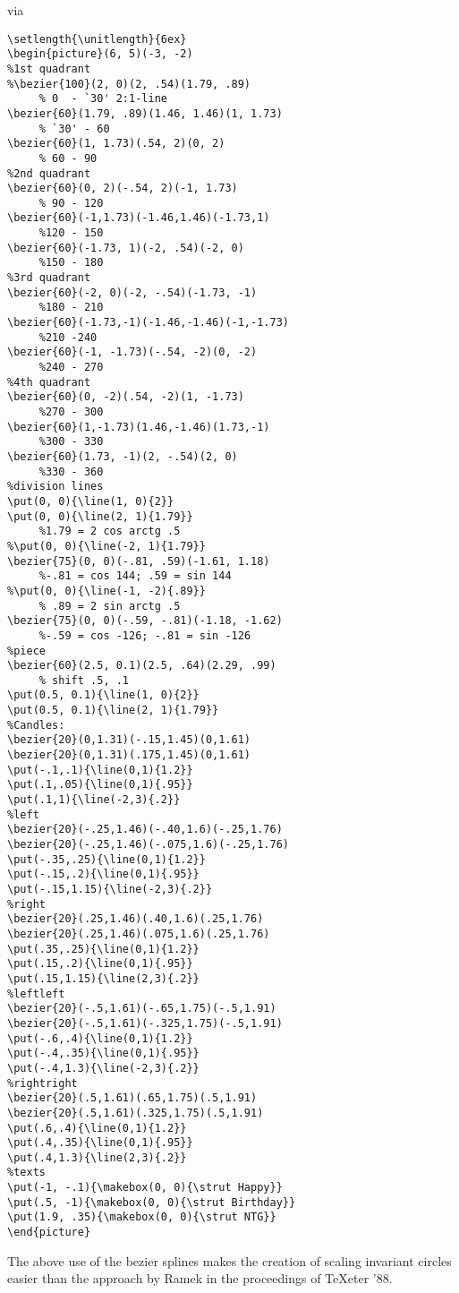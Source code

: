 \begin{itemize}
\par\noindent via
\begingroup\small
\begin{verbatim}
\setlength{\unitlength}{6ex}
\begin{picture}(6, 5)(-3, -2)
%1st quadrant
%\bezier{100}(2, 0)(2, .54)(1.79, .89)
     % 0  - `30' 2:1-line
\bezier{60}(1.79, .89)(1.46, 1.46)(1, 1.73)
     % `30' - 60
\bezier{60}(1, 1.73)(.54, 2)(0, 2)
     % 60 - 90
%2nd quadrant
\bezier{60}(0, 2)(-.54, 2)(-1, 1.73)
     % 90 - 120
\bezier{60}(-1,1.73)(-1.46,1.46)(-1.73,1)
     %120 - 150
\bezier{60}(-1.73, 1)(-2, .54)(-2, 0)
     %150 - 180
%3rd quadrant
\bezier{60}(-2, 0)(-2, -.54)(-1.73, -1)
     %180 - 210
\bezier{60}(-1.73,-1)(-1.46,-1.46)(-1,-1.73)
     %210 -240
\bezier{60}(-1, -1.73)(-.54, -2)(0, -2)
     %240 - 270
%4th quadrant
\bezier{60}(0, -2)(.54, -2)(1, -1.73)
     %270 - 300
\bezier{60}(1,-1.73)(1.46,-1.46)(1.73,-1)
     %300 - 330
\bezier{60}(1.73, -1)(2, -.54)(2, 0)
     %330 - 360
%division lines
\put(0, 0){\line(1, 0){2}}
\put(0, 0){\line(2, 1){1.79}}
     %1.79 = 2 cos arctg .5
%\put(0, 0){\line(-2, 1){1.79}}
\bezier{75}(0, 0)(-.81, .59)(-1.61, 1.18)
     %-.81 = cos 144; .59 = sin 144
%\put(0, 0){\line(-1, -2){.89}}
     % .89 = 2 sin arctg .5
\bezier{75}(0, 0)(-.59, -.81)(-1.18, -1.62)
     %-.59 = cos -126; -.81 = sin -126
%piece
\bezier{60}(2.5, 0.1)(2.5, .64)(2.29, .99)
     % shift .5, .1
\put(0.5, 0.1){\line(1, 0){2}}
\put(0.5, 0.1){\line(2, 1){1.79}}
%Candles:
\bezier{20}(0,1.31)(-.15,1.45)(0,1.61)
\bezier{20}(0,1.31)(.175,1.45)(0,1.61)
\put(-.1,.1){\line(0,1){1.2}}
\put(.1,.05){\line(0,1){.95}}
\put(.1,1){\line(-2,3){.2}}
%left
\bezier{20}(-.25,1.46)(-.40,1.6)(-.25,1.76)
\bezier{20}(-.25,1.46)(-.075,1.6)(-.25,1.76)
\put(-.35,.25){\line(0,1){1.2}}
\put(-.15,.2){\line(0,1){.95}}
\put(-.15,1.15){\line(-2,3){.2}}
%right
\bezier{20}(.25,1.46)(.40,1.6)(.25,1.76)
\bezier{20}(.25,1.46)(.075,1.6)(.25,1.76)
\put(.35,.25){\line(0,1){1.2}}
\put(.15,.2){\line(0,1){.95}}
\put(.15,1.15){\line(2,3){.2}}
%leftleft
\bezier{20}(-.5,1.61)(-.65,1.75)(-.5,1.91)
\bezier{20}(-.5,1.61)(-.325,1.75)(-.5,1.91)
\put(-.6,.4){\line(0,1){1.2}}
\put(-.4,.35){\line(0,1){.95}}
\put(-.4,1.3){\line(-2,3){.2}}
%rightright
\bezier{20}(.5,1.61)(.65,1.75)(.5,1.91)
\bezier{20}(.5,1.61)(.325,1.75)(.5,1.91)
\put(.6,.4){\line(0,1){1.2}}
\put(.4,.35){\line(0,1){.95}}
\put(.4,1.3){\line(2,3){.2}}
%texts
\put(-1, -.1){\makebox(0, 0){\strut Happy}}
\put(.5, -1){\makebox(0, 0){\strut Birthday}}
\put(1.9, .35){\makebox(0, 0){\strut NTG}}
\end{picture}
\end{verbatim}\endgroup
\noindent
The above use of the bezier splines makes the
creation of scaling invariant circles
easier than the approach by Ramek in the proceedings of
\TeX eter '88.


\end{itemize}

